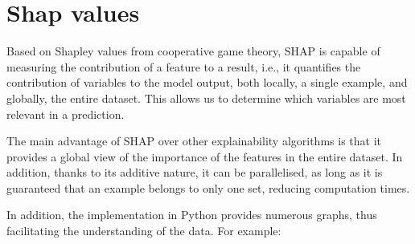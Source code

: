 \section{Shap values}

Based on Shapley values from cooperative game theory, SHAP is capable of measuring the contribution of a feature to a result, i.e., it quantifies the contribution of variables to the model output, both locally, a single example, and globally, the entire dataset. This allows us to determine which variables are most relevant in a prediction. 

The main advantage of SHAP over other explainability algorithms is that it provides a global view of the importance of the features in the entire dataset. In addition, thanks to its additive nature, it can be parallelised, as long as it is guaranteed that an example belongs to only one set, reducing computation times.

In addition, the implementation in Python \cite{shap} provides numerous graphs, thus facilitating the understanding of the data. For example:

